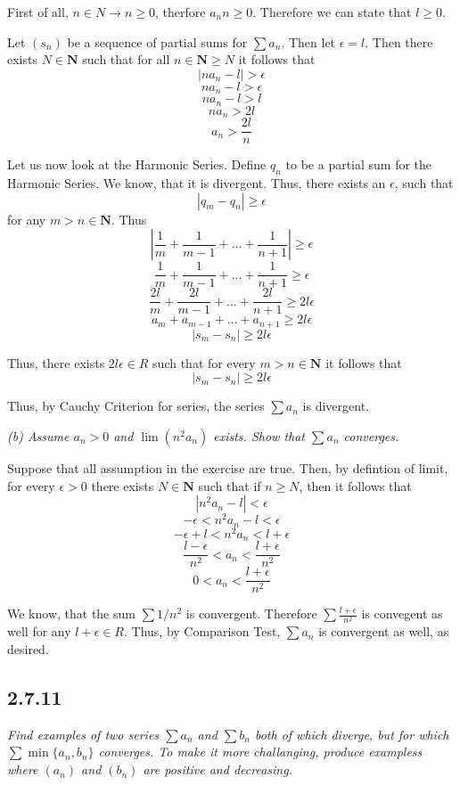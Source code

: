 \documentclass[11pt,oneside,titlepage]{book}
\begin{document}
First of all, $n \in N \to n \geq 0$, therfore $a_n n \geq 0$. Therefore
we can state that $l \geq 0$.

Let $(s_n)$ be a sequence of  partial sums  for $\sum a_n$. Then
let $\epsilon = l$. Then there exists $N \in \textbf{N}$ such that for all
$n \in \textbf{N} \geq N$ it follows that
$$ |n a_n - l| > \epsilon$$
$$ n a_n - l > \epsilon$$
$$ n a_n - l > l $$
$$ n a_n  > 2l $$
$$ a_n  > \frac{2l}{n} $$

Let us now look at the Harmonic Series. Define $q_n$ to be a partial sum for
the Harmonic Series. We know, that it is divergent. Thus,
there exists an $\epsilon$, such that
$$|q_m - q_n| \geq \epsilon$$
for any $m > n \in \textbf{N}$. Thus
$$|\frac{1}{m} + \frac{1}{m - 1} + ... + \frac{1}{n + 1} | \geq \epsilon$$
$$\frac{1}{m} + \frac{1}{m - 1} + ... + \frac{1}{n + 1} \geq \epsilon$$
$$\frac{2l}{m} + \frac{2l}{m - 1} + ... + \frac{2l}{n + 1} \geq 2l \epsilon$$
$$a_m + a_{m - 1} + ... + a_{n + 1} \geq 2l \epsilon$$
$$|s_m - s_n| \geq 2l \epsilon$$

Thus, there exists $2l\epsilon \in R$ such that for every
$m > n \in \textbf{N}$ it follows that 
$$|s_m - s_n| \geq 2l \epsilon$$

Thus, by Cauchy Criterion for series, the series $\sum a_n$ is divergent.

\textit{(b) Assume $a_n > 0$ and $\lim(n^2 a_n)$ exists. Show that
  $\sum a_n$ converges.}

Suppose that all assumption in the exercise are true. Then, by defintion
of limit, for every $\epsilon > 0$
there exists $N \in \textbf{N}$ such that if $n \geq N$, then it
follows that
$$|n^2 a_n - l| < \epsilon$$
$$- \epsilon < n^2 a_n - l < \epsilon$$
$$- \epsilon + l < n^2 a_n  < l + \epsilon$$
$$\frac{l - \epsilon}{n^2} < a_n  < \frac{l + \epsilon}{n^2}$$
$$0< a_n  < \frac{l + \epsilon}{n^2}$$

We know, that the sum $\sum 1/n^2$ is convergent. Therefore
$\sum \frac{ l + \epsilon}{n^2}$ is convegent as well for any
$l + \epsilon \in R$. Thus, by Comparison Test, $\sum a_n$ is convergent as
well, as desired.

\subsection*{2.7.11}
\textit{Find examples of two series $\sum a_n$ and $\sum b_n$ both of which
  diverge, but for which $\sum \min\{a_n, b_n\}$ converges. To make it more
  challanging, produce exampless where $(a_n)$ and $(b_n)$ are positive and
  decreasing.}
\end{document}
